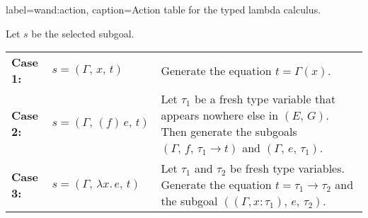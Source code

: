 \begin{taplfigure}{label=wand:action, caption={Action table for the typed lambda calculus.}}

\quad Let $s$ be the selected subgoal.

\bigskip\quad
\setlength{\tabcolsep}{4pt}
\begin{tabular}{ l l p{7cm}}
\textbf{Case 1:} & $s = (\Gamma,\, x,\, t)$
                 & Generate the equation $t = \Gamma (x)$.\\
	
\textbf{Case 2:} & $s = (\Gamma,\, (f)\, e,\, t)$
                 & Let $\tau_1$ be a fresh type variable that
                   appears nowhere else in $(E,\, G)$. Then generate
                   the subgoals $(\Gamma,\, f,\, \tau_1 \rightarrow t)$
                   and $(\Gamma,\, e,\, \tau_1)$.\\
	                                                    
\textbf{Case 3:} & $s = (\Gamma,\, \lambda x.\, e,\, t)$
                 & Let $\tau_1$ and $\tau_2$ be fresh type variables.
                  Generate the equation $t = \tau_1 \rightarrow \tau_2$
                  and the subgoal \mbox{$((\Gamma,x:\tau_1),\, e,\, \tau_2)$}.\\

\end{tabular}

\end{taplfigure}
